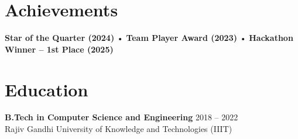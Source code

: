 \documentclass[11pt]{article}
\begin{document}
\section*{Achievements}
\textbf{Star of the Quarter (2024)} • \textbf{Team Player Award (2023)} • \textbf{Hackathon Winner – 1st Place (2025)}

\section*{Education}
\textbf{B.Tech in Computer Science and Engineering} \hfill 2018 -- 2022 \\
Rajiv Gandhi University of Knowledge and Technologies (IIIT)
\end{document}
